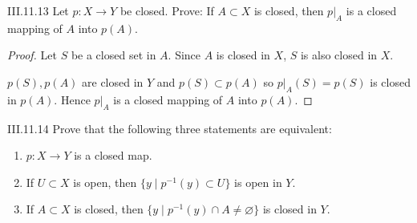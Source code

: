 \begin{problem}{III.11.13}
Let \( p: X \to Y \) be closed. Prove: If \( A \subset X \) is closed, then \( p\vert_{A} \) is a closed mapping of \( A \) into \( p(A) \).
\end{problem}

\begin{proof}
    Let \( S \) be a closed set in \( A \). Since \( A \) is closed in \( X \), \( S \) is also closed in \( X \).

    \( p(S), p(A) \) are closed in \( Y \) and \( p(S) \subset p(A) \) so \( p\vert_{A}(S) = p(S) \) is closed in \( p(A) \). Hence \( p\vert_{A} \) is a closed mapping of \(A\) into \(p(A)\).
\end{proof}

\begin{problem}{III.11.14}
Prove that the following three statements are equivalent:
\begin{enumerate}[label={(\alph*)}]
    \item \( p: X \to Y \) is a closed map.
    \item If \( U \subset X \) is open, then \(\{ y \mid p^{-1}(y) \subset U \}\) is open in \( Y \).
    \item If \( A \subset X \) is closed, then \(\{ y \mid p^{-1}(y) \cap A \neq \varnothing \}\) is closed in \( Y \).
\end{enumerate}
\end{problem}

